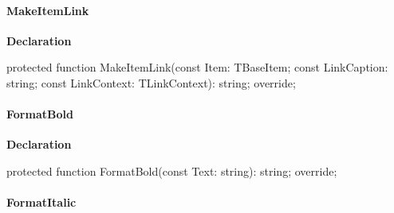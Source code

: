 \documentclass{report}
\newif\ifpdf
\begin{document}
\paragraph*{MakeItemLink}\hspace*{\fill}

\label{PasDoc_GenLatex.TTexDocGenerator-MakeItemLink}
\begin{list}{}{
\setlength{\itemindent}{0cm}
\setlength{\listparindent}{0cm}
\setlength{\leftmargin}{\evensidemargin}
\addtolength{\leftmargin}{\tmplength}
\settowidth{\labelsep}{X}
\addtolength{\leftmargin}{\labelsep}
\setlength{\labelwidth}{\tmplength}
}
\item[\textbf{Declaration}\hfill]
\ifpdf
\begin{flushleft}
\fi
\begin{ttfamily}
protected function MakeItemLink(const Item: TBaseItem; const LinkCaption: string; const LinkContext: TLinkContext): string; override;\end{ttfamily}

\ifpdf
\end{flushleft}
\fi

\end{list}
\paragraph*{FormatBold}\hspace*{\fill}

\label{PasDoc_GenLatex.TTexDocGenerator-FormatBold}
\begin{list}{}{
\setlength{\itemindent}{0cm}
\setlength{\listparindent}{0cm}
\setlength{\leftmargin}{\evensidemargin}
\addtolength{\leftmargin}{\tmplength}
\settowidth{\labelsep}{X}
\addtolength{\leftmargin}{\labelsep}
\setlength{\labelwidth}{\tmplength}
}
\item[\textbf{Declaration}\hfill]
\ifpdf
\begin{flushleft}
\fi
\begin{ttfamily}
protected function FormatBold(const Text: string): string; override;\end{ttfamily}

\ifpdf
\end{flushleft}
\fi

\end{list}
\paragraph*{FormatItalic}\hspace*{\fill}
\end{document}
